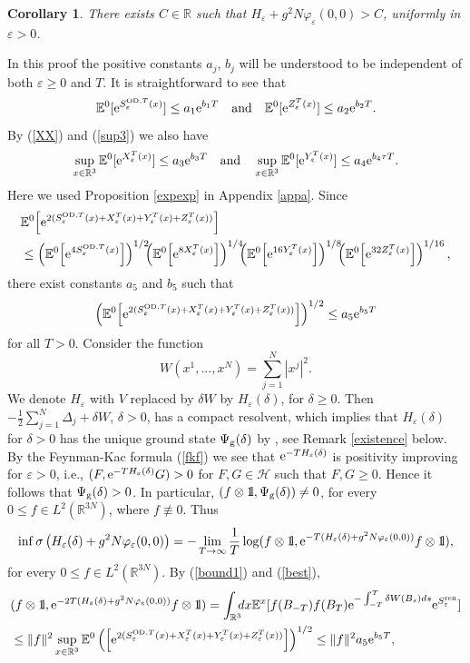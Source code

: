 \documentclass[11pt]{article}
\newtheorem{corollary}[theorem]{Corollary}
\providecommand{\bc}[1]{\begin{corollary}\label{#1}}
\providecommand{\ec}{\end{corollary}}
\def\bbbone{{\mathchoice {\rm 1\mskip-4mu l} {\rm 1\mskip-4mu l}
{\rm 1\mskip-4.5mu l} {\rm 1\mskip-5mu l}}}
\def\one{\bbbone}
\providecommand{\idx}{\int_{\BR} \!\!\! dx}
\newcommand{\Ebb}{{\mathbb E}}
\providecommand{\eq}[1]{\begin{equation}\label{#1}}
\providecommand{\en}{\end{equation}}
\providecommand{\BR}{{\mathbb{R}^3 }}
\providecommand{\BRN}{{\mathbb{R}^{3N} }}
\providecommand{\od}{{\rm OD}}
\providecommand{\RR}{\mathbb{R}}
\providecommand{\kak}[1]{(\ref{#1})}
\providecommand{\LRN}{{L^2(\BRN)}}
\providecommand{\hn}{H}%
\providecommand{\ms}[1]{\mathscr{#1}}
\providecommand{\is}{\inf \s}
\providecommand{\lk}{\left(}
\providecommand{\rk}{\right)}
\providecommand{\gr}{\Psi_{\rm g}}
\providecommand{\half}{\frac{1}{2}}
\providecommand{\han}{{1/2}}
\providecommand{\s}{\sigma}
\providecommand{\hhh}{\ms H} %
\providecommand{\e}{{\rm e}}
\providecommand{\1}{\mathbb{1}}
\providecommand {\s}  {\ensuremath {\mathcal{S}}}
\providecommand{\eps}{\varepsilon}
\providecommand{\ren}{{\rm ren}}
\newcounter {constant}
\begin{document}
\bc{nelson}
There exists $C \in \RR$ such that $\hn_\eps+g^2 N\varphi_\eps(0,0)>C$, uniformly in $\eps>0$.
\ec
\proof
In this proof the positive constants $a_j$, $b_j$ will be understood to be independent of both
$\eps\geq0$ and $T$. It is straightforward to  see that
$$
\Ebb^0[\e^{ S_\eps^{\od,T}(x)}]\leq a_1\e^{b_1T} \quad \mbox{and} \quad
\Ebb^0[\e^{ Z_\eps^T(x)}]\leq a_2\e^{b_2T}.
$$
By \kak{XX} and
 \kak{sup3} we also have
$$\sup_{x\in\BR} \Ebb^0[\e^{ X_\eps^T(x)}] \leq a_3\e^{b_3 T}\quad \mbox{and}
\quad
\sup_{x\in\BR}\Ebb^0[\e^{ Y_\eps^T(x)}]\leq a_4\e^{b_4 \tau T}.$$
Here we  used Proposition
\ref{expexp} in Appendix \ref{appa}. Since
\begin{align*}
&\Ebb^0\!\left [ \e^{2(
S_\eps^{\od, T}(x)+X_\eps^T(x)+Y_\eps^T(x)+Z_\eps^T(x))}\right]\\
&\leq
\lk \Ebb^0\!\left[\e^{4 S_\eps^{\od,T}(x)}\right]\rk^\han \!\!\! \lk 
\Ebb^0\!\left[\e^{8 X_\eps^T(x)}\right]\rk
^{1/4} \!\!\! \lk 
\Ebb^0\!\left[\e^{16 Y_\eps^T(x)}\right]\rk^{1/8} \!\!\!
\lk \Ebb^0\!\left[\e^{32 Z_\eps^T(x)}\right]\rk^{1/16},
\end{align*}
there exist constants $a_5$ and $b_5$ such that
\eq{best}
\lk
\Ebb^0\!\left [ \e^{2(S_\eps^{\od, T}(x)+X_\eps^T(x)+Y_\eps^T(x)+Z_\eps^T(x))}\right]\rk^\han
\leq a_5 \e^{b_5T}
\en
for all $T>0$. Consider the function
$$
W(x^1,...,x^N)=\sum_{j=1}^N |x^j|^2.
$$
We denote $H_\eps$ with $V$ replaced by $\delta W$ by $H_\eps(\delta)$, for $\delta\geq0$.
Then $-\half \sum_{j=1}^N \Delta_j +\delta W$, $\delta>0$, has a compact resolvent, which implies
that $H_\eps(\delta)$ for $\delta>0$  has the unique ground state $\gr(\delta)$ by \cite{spo98,ger00},
see Remark \ref{existence} below. By the Feynman-Kac formula \kak{fkf} we see that $\e^{-TH_\eps(\delta)}$
is positivity improving for $\eps>0$, i.e., $(F, \e^{-TH_\eps(\delta)}G)>0$ for $F,G\in \hhh$ such that
$F, G\geq 0$. Hence it follows that $\gr(\delta)>0$. In particular, $(f\otimes \one, \gr(\delta))\neq 0$,
for every $0\leq  f\in\LRN$, where $f\not\equiv 0$. Thus
\eq{inf}
\is \left(H_\eps(\delta)+g^2 N\varphi_\eps(0,0)\right)
=
-\lim_{T\to \infty}\frac{1}{T}\log (f\otimes \one, \e^{-T(H_\eps(\delta)+g^2 N\varphi_\eps(0,0))}f\otimes\one),
\en
for every $0\leq f\in \LRN$. By \kak{bound1} and \kak{best},
\begin{align*}
&(f\otimes \one, \e^{-2T(H_\eps(\delta)+g^2 N\varphi_\eps(0,0))}f\otimes \one)
=
\idx \Ebb^x[f(B_{-T}) f(B_{T})\e^{-\int_{-T}^{T}\delta W(B_s) ds}\e^{S_\eps^\ren}]\\
&\leq
\|f\|^2 \sup_{x\in\BR} \Ebb^0 \lk
\left[\e^{2(S_\eps^{\od, T}(x)+X_\eps^T(x)+Y_\eps^T(x)+Z_\eps^T(x))} \right]\rk^\han
\leq
\|f\|^2 a_5\e^{b_5 T},
\end{align*}
\end{document}
